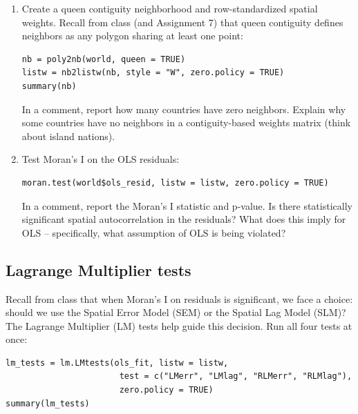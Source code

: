 \begin{enumerate}[label=\alph*)]

  \item Create a queen contiguity neighborhood and row-standardized spatial weights. Recall from class (and Assignment 7) that queen contiguity defines neighbors as any polygon sharing at least one point:
  \begin{lstlisting}
nb = poly2nb(world, queen = TRUE)
listw = nb2listw(nb, style = "W", zero.policy = TRUE)
summary(nb)
  \end{lstlisting}
  In a comment, report how many countries have zero neighbors. Explain why some countries have no neighbors in a contiguity-based weights matrix (think about island nations).

  \item Test Moran's I on the OLS residuals:
  \begin{lstlisting}
moran.test(world$ols_resid, listw = listw, zero.policy = TRUE)
  \end{lstlisting}
  In a comment, report the Moran's I statistic and p-value. Is there statistically significant spatial autocorrelation in the residuals? What does this imply for OLS -- specifically, what assumption of OLS is being violated?

\end{enumerate}

\subsection{Lagrange Multiplier tests}

Recall from class that when Moran's I on residuals is significant, we face a choice: should we use the Spatial Error Model (SEM) or the Spatial Lag Model (SLM)? The Lagrange Multiplier (LM) tests help guide this decision. Run all four tests at once:

\begin{lstlisting}
lm_tests = lm.LMtests(ols_fit, listw = listw,
                       test = c("LMerr", "LMlag", "RLMerr", "RLMlag"),
                       zero.policy = TRUE)
summary(lm_tests)
\end{lstlisting}

